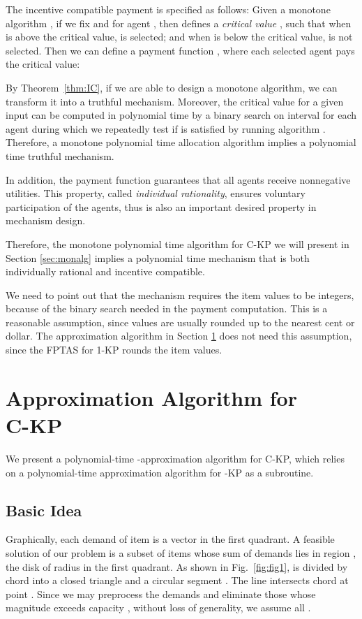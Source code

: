 \documentclass{aamas2013}
\begin{document}
The incentive compatible payment  is specified as follows:
Given a monotone algorithm , if we fix  and  for agent , then  defines a {\em critical value} , such that when  is above the critical value,  is selected; and when  is below the critical value,  is not selected.  Then we can define a payment function , where each selected agent pays the critical value:  

By Theorem~\ref{thm:IC}, if we are able to design a monotone algorithm, we can transform it into a truthful mechanism.  Moreover, the critical value for a given input can be computed in polynomial time by a binary search on interval  for each agent  during which we repeatedly test if  is satisfied by running algorithm . Therefore, a monotone polynomial time allocation algorithm  implies a polynomial time truthful mechanism.

In addition, the payment function  guarantees that all agents receive nonnegative utilities.  This property, called {\em individual rationality}, ensures voluntary participation of the agents, thus is also an important desired property in mechanism design.   
 
Therefore, the monotone polynomial time algorithm for C-KP we will present in Section \ref{sec:monalg} implies a polynomial time mechanism that is both individually rational and incentive compatible.  

We need to point out that the mechanism requires the item values  to be integers, because of the binary search needed in the payment computation.  This is a reasonable assumption, since values are usually rounded up to the nearest cent or dollar.  The approximation algorithm in Section \ref{sec:algCKP} does not need this assumption, since the FPTAS for 1-KP rounds the item values.   


\section{Approximation Algorithm for \\C-KP}\label{sec:algCKP}
\noindent
We present a polynomial-time -approximation algorithm for {\sc C-KP}, which relies on a polynomial-time approximation algorithm for {-KP} as a subroutine.   
\subsection{Basic Idea} \label{subsec:pic}
\noindent
Graphically, each demand  of item  is a vector in the first quadrant.  A feasible solution of our problem is a subset of items whose sum of demands lies in region , the  disk of radius  in the first quadrant. 
As shown in Fig.~\ref{fig:fig1},  is divided by chord  into a closed triangle  and a circular segment .  The  line intersects chord  at point .  Since we may preprocess the demands and eliminate those whose magnitude exceeds capacity , without loss of generality, we assume all .  
\end{document}
